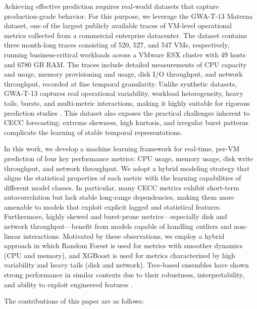 \documentclass[a4paper,fleqn]{cas-dc}
\begin{document}
Achieving effective prediction requires real-world datasets that capture production-grade behavior. For this purpose, we leverage the GWA-T-13 Materna dataset, one of the largest publicly available traces of VM-level operational metrics collected from a commercial enterprise datacenter. The dataset contains three month-long traces consisting of 520, 527, and 547 VMs, respectively, running business-critical workloads across a VMware ESX cluster with 49 hosts and 6780 GB RAM. The traces include detailed measurements of CPU capacity and usage, memory provisioning and usage, disk I/O throughput, and network throughput, recorded at fine temporal granularity. Unlike synthetic datasets, GWA-T-13 captures real operational variability, workload heterogeneity, heavy tails, bursts, and multi-metric interactions, making it highly suitable for rigorous prediction studies \cite{b9}. This dataset also exposes the practical challenges inherent to CECC forecasting: extreme skewness, high kurtosis, and irregular burst patterns complicate the learning of stable temporal representations.

In this work, we develop a machine learning framework for real-time, per-VM prediction of four key performance metrics: CPU usage, memory usage, disk write throughput, and network throughput. We adopt a hybrid modeling strategy that aligns the statistical properties of each metric with the learning capabilities of different model classes. In particular, many CECC metrics exhibit short-term autocorrelation but lack stable long-range dependencies, making them more amenable to models that exploit explicit lagged and statistical features. Furthermore, highly skewed and burst-prone metrics---especially disk and network throughput---benefit from models capable of handling outliers and non-linear interactions. Motivated by these observations, we employ a hybrid approach in which Random Forest is used for metrics with smoother dynamics (CPU and memory), and XGBoost is used for metrics characterized by high variability and heavy tails (disk and network). Tree-based ensembles have shown strong performance in similar contexts due to their robustness, interpretability, and ability to exploit engineered features \cite{b10}.

The contributions of this paper are as follows:
\end{document}
